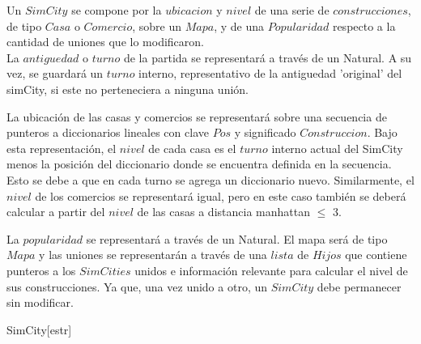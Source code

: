 \begin{Representacion}
  
Un $SimCity$ se compone por la $ubicacion$ y $nivel$ de una serie de $construcciones$, de tipo $Casa$ o $Comercio$, sobre un $Mapa$, y de una $Popularidad$ respecto a la cantidad de uniones que lo modificaron. \\

La $antiguedad$ o $turno$ de la partida se representará a través de un Natural. A su vez, se guardará un $turno$ interno, representativo de la antiguedad 'original' del simCity, si este no perteneciera a ninguna unión. 

La ubicación de las casas y comercios se representará sobre una secuencia de punteros a diccionarios lineales con clave $Pos$ y significado $Construccion$. Bajo esta representación, el $nivel$ de cada casa es el $turno$ interno actual del SimCity menos la posición del diccionario donde se encuentra definida en la secuencia. Esto se debe a que en cada turno se agrega un diccionario nuevo. Similarmente, el $nivel$ de los comercios se representará igual, pero en este caso también se deberá calcular a partir del $nivel$ de las casas a distancia  manhattan $\leq$ 3. 

La $popularidad$ se representará a través de un Natural. El mapa será de tipo $Mapa$ y las uniones se representarán a través de una $lista$ de $Hijos$ que contiene punteros a los $SimCities$ unidos e información relevante para calcular el nivel de sus construcciones. Ya que, una vez unido a otro, un $SimCity$ debe permanecer sin modificar. 

    \begin{Estructura}{SimCity}[estr]
        \begin{Tupla}[estr]
        \end{Tupla}
        
        \vspace{2mm}
        \begin{Tupla}[hijo]
        \end{Tupla}
        

\end{Estructura}
\end{Representacion}
